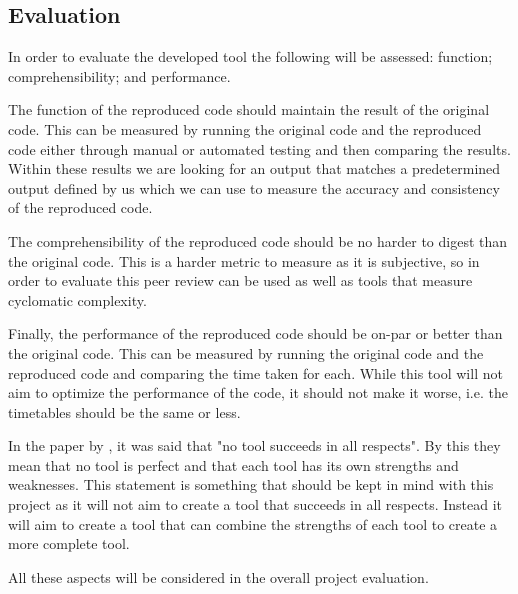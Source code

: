 \subsection{Evaluation}

In order to evaluate the developed tool the following will be assessed: function; comprehensibility; and performance.

The function of the reproduced code should maintain the result of the original code. This can be measured by running the original code and the reproduced code either through manual or automated testing and then comparing the results. Within these results we are looking for an output that matches a predetermined output defined by us which we can use to measure the accuracy and consistency of the reproduced code.

The comprehensibility of the reproduced code should be no harder to digest than the original code. This is a harder metric to measure as it is subjective, so in order to evaluate this peer review can be used as well as tools that measure cyclomatic complexity.

Finally, the performance of the reproduced code should be on-par or better than the original code. This can be measured by running the original code and the reproduced code and comparing the time taken for each. While this tool will not aim to optimize the performance of the code, it should not make it worse, i.e. the timetables should be the same or less.

In the paper by \cite{8681007}, it was said that "no tool succeeds in all respects". By this they mean that no tool is perfect and that each tool has its own strengths and weaknesses. This statement is something that should be kept in mind with this project as it will not aim to create a tool that succeeds in all respects. Instead it will aim to create a tool that can combine the strengths of each tool to create a more complete tool.

All these aspects will be considered in the overall project evaluation.
